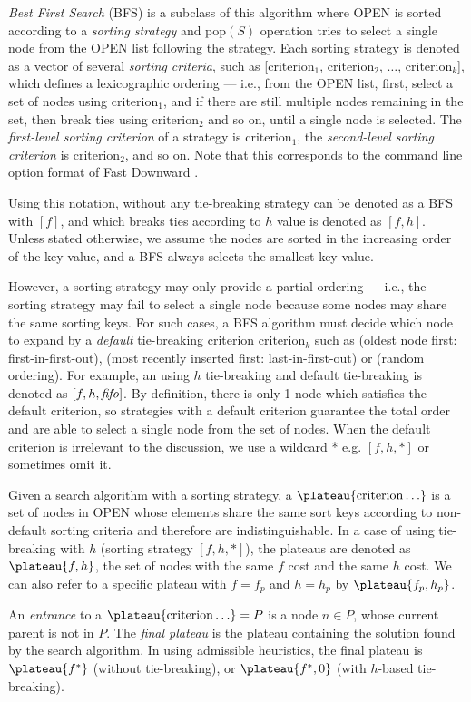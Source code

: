 \emph{Best First Search} (BFS) is a subclass of this algorithm where OPEN is sorted according to a \emph{sorting strategy} and pop$(S)$ operation tries to select a single node from the OPEN list following the strategy.
Each sorting strategy is denoted as a vector of several \emph{sorting criteria}, such as
[$\text{criterion}_1$, $\text{criterion}_2$, $\ldots$,
$\text{criterion}_k$], which defines a lexicographic ordering ---
i.e., from the OPEN list, first, select a
set of nodes using $\text{criterion}_1$, and if there are still multiple
nodes remaining in the set, then break ties using $\text{criterion}_2$
and so on, until a single node is selected.  The \emph{first-level
sorting criterion} of a strategy is $\text{criterion}_1$, the
\emph{second-level sorting criterion} is $\text{criterion}_2$, and so on.
Note that this corresponds to the command line option format of Fast
Downward \cite{Helmert2006}.

Using this notation, \astar without any tie-breaking strategy can be
denoted as a BFS with $[f]$, and \astar which breaks ties according to $h$
value is denoted as $[f,h]$.
Unless stated otherwise, we assume the nodes are sorted in the
increasing order of the key value, and a BFS always selects the smallest
key value.

However, a sorting strategy may only provide a partial ordering ---
i.e., the sorting strategy may fail to select a single node because some nodes
may share the same sorting keys.
For such cases, a BFS algorithm must
decide which node to expand by a \emph{default} tie-breaking
criterion $\text{criterion}_k$ such as  \fifo (oldest node first: first-in-first-out), \lifo
(most recently inserted first: last-in-first-out) or \ro (random ordering).
For example, an \astar using $h$ tie-breaking and \fifo default tie-breaking
 is denoted as $[f,h,{\text{\textit{fifo}}}]$.
By definition, there is only 1 node which satisfies the default criterion, so
strategies with a default criterion guarantee the total order and
are able to select a single node from the set of nodes.
When the default criterion is irrelevant to the discussion,
we use a wildcard * e.g. $[f,h,*]$ or sometimes omit it.

Given a search algorithm with a sorting strategy, 
a $\plateau{\text{criterion}\ldots}$ is a set of nodes in OPEN whose elements share
the same sort keys according to non-default sorting criteria and therefore
are indistinguishable. In a case of \astar
using tie-breaking with $h$ (sorting strategy $[f,h,*]$), the plateaus are denoted as
$\plateau{f,h}$, the set of nodes with the same $f$ cost and the same $h$ cost.
We can also refer to a specific plateau with $f=f_p$ and $h=h_p$ by $\plateau{f_p,h_p}$.

An \emph{entrance} to a $\plateau{\text{criterion}\ldots}=P$ is
a node $n \in P$, whose current parent is not in
$P$. The \emph{final plateau} is the plateau
containing the solution found by the search algorithm.  In \astar using
admissible heuristics, the final plateau is $\plateau{f^*}$ (without
tie-breaking), or $\plateau{f^*,0}$ (with $h$-based tie-breaking).
